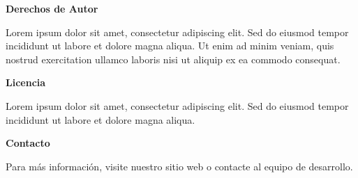 
\thispagestyle{empty}


\vspace*{\fill}

\begin{center}
\textbf{Derechos de Autor}\\
\end{center}

Lorem ipsum dolor sit amet, consectetur adipiscing elit. Sed do eiusmod tempor incididunt ut labore et dolore magna aliqua. Ut enim ad minim veniam, quis nostrud exercitation ullamco laboris nisi ut aliquip ex ea commodo consequat.

\bigskip

\begin{center}
\textbf{Licencia}\\
\end{center}

Lorem ipsum dolor sit amet, consectetur adipiscing elit. Sed do eiusmod tempor incididunt ut labore et dolore magna aliqua.

\bigskip

\begin{center}
\textbf{Contacto}\\
\end{center}

Para más información, visite nuestro sitio web o contacte al equipo de desarrollo.

\vspace*{\fill}

\clearpage
\restoregeometry
